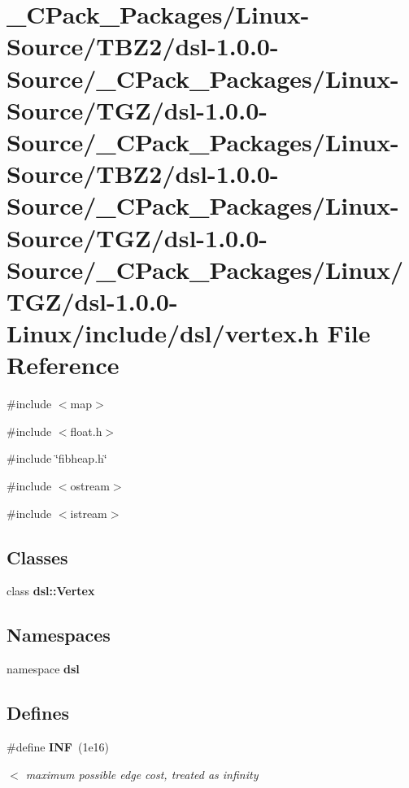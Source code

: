 \section{\_\-CPack\_\-Packages/Linux-\/Source/TBZ2/dsl-\/1.0.0-\/Source/\_\-CPack\_\-Packages/Linux-\/Source/TGZ/dsl-\/1.0.0-\/Source/\_\-CPack\_\-Packages/Linux-\/Source/TBZ2/dsl-\/1.0.0-\/Source/\_\-CPack\_\-Packages/Linux-\/Source/TGZ/dsl-\/1.0.0-\/Source/\_\-CPack\_\-Packages/Linux/TGZ/dsl-\/1.0.0-\/Linux/include/dsl/vertex.h File Reference}
\label{__CPack__Packages_2Linux-Source_2TBZ2_2dsl-1_80_80-Source_2__CPack__Packages_2Linux-Source_2TGZ_e06f038ad8b037ff680e9a85a1cf3d41}
{\ttfamily \#include $<$map$>$}\par
{\ttfamily \#include $<$float.h$>$}\par
{\ttfamily \#include \char`\"{}fibheap.h\char`\"{}}\par
{\ttfamily \#include $<$ostream$>$}\par
{\ttfamily \#include $<$istream$>$}\par
\subsection*{Classes}
\begin{DoxyCompactItemize}
\item 
class {\bf dsl::Vertex}
\end{DoxyCompactItemize}
\subsection*{Namespaces}
\begin{DoxyCompactItemize}
\item 
namespace {\bf dsl}
\end{DoxyCompactItemize}
\subsection*{Defines}
\begin{DoxyCompactItemize}
\item 
\#define {\bf INF}~(1e16)
\begin{DoxyCompactList}\small\item\em $<$ maximum possible edge cost, treated as infinity \item\end{DoxyCompactList}\end{DoxyCompactItemize}
